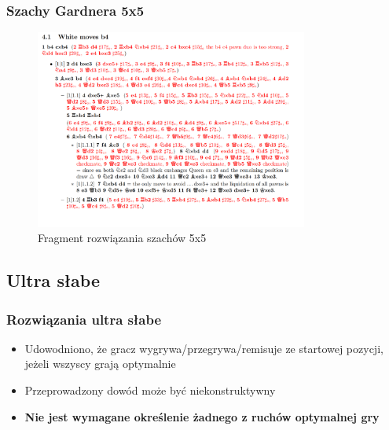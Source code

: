 \documentclass[polish,envcountsect,10pt]{beamer}
\begin{document}
                \begin{frame}
                    \frametitle{Szachy Gardnera 5x5}
                            \begin{figure}[H]
                                \centering
                                \includegraphics[width=0.8\textwidth]{images/gardner_proof}
                                \caption{Fragment rozwiązania szachów 5x5}
                            \end{figure}    
                \end{frame}

        \subsection{Ultra słabe}
            \begin{frame}
                \frametitle{Rozwiązania ultra słabe}
                \begin{itemize}
                    \item<1-> Udowodniono, że gracz wygrywa/przegrywa/remisuje ze startowej pozycji, jeżeli wszyscy grają optymalnie
                    \item<2-> Przeprowadzony dowód może być niekonstruktywny
                    \item<3-> \textbf{Nie jest wymagane określenie żadnego z ruchów optymalnej gry}
                \end{itemize}
            \end{frame}
\end{document}
